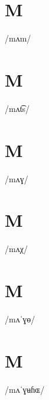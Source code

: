 \documentclass[10pt,a4paper,twoside]{book}
\begin{document}
\section*{M}

\begin{multicols}{3}
 {/mʌm/} {}
\end{multicols}

\section*{M}

\begin{multicols}{3}
 {/mʌt͡s/} {}
\end{multicols}

\section*{M}

\begin{multicols}{3}
 {/mʌɣ/} {}
\end{multicols}

\section*{M}

\begin{multicols}{3}
 {/mʌχ/} {}
\end{multicols}

\section*{M}

\begin{multicols}{3}
 {/mʌˈɣɵ/} {}
\end{multicols}

\section*{M}

\begin{multicols}{3}
 {/mʌˈɣʉɦɶ/} {}
\end{multicols}
\end{document}
